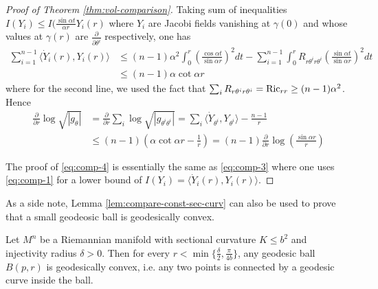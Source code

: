 \documentclass[11pt]{article}
\begin{document}
\begin{proof}[Proof of Theorem \ref{thm:vol-comparison}]
Taking sum of inequalities \(I(Y_{i}) \leq I(\frac{\sin \alpha t}{\alpha
r}Y_i(r)\) where \(Y_i\) are Jacobi fields vanishing at \(\gamma(0)\) and
whose values at \(\gamma(r)\) are \(\frac{\partial}{\partial \theta^i}\) respectively,
one has
\begin{equation*}
\begin{split}
\sum_{i=1}^{n-1} \langle \dot Y_i(r), Y_i(r) \rangle &\leq	(n-1)\alpha^2 \int_0^r\left( \frac{\cos \alpha t}{\sin \alpha r}\right)^2 dt -\sum_{i=1}^{n-1}\int_0^r R_{r\theta^ir\theta^i}\left(\frac{\sin \alpha t}{\sin \alpha r}\right)^2 dt\\
		 	 &\leq (n-1)\alpha\cot \alpha r
\end{split}   
\end{equation*}
where for the second line, we used the fact that \(\sum_i R_{r\theta^i r\theta^i}={\rm
Ric}_{rr}\geq (n-1)\alpha^2\). Hence 
\begin{equation*}
\begin{split}
\frac{\partial}{\partial r}\log\sqrt{|g_\theta|}&= \frac{\partial}{\partial
r}\sum_i\log\sqrt{|g_{\theta^i\theta^i}|} = \sum_i \langle \dot
Y_{\theta^i},Y_{\theta^i}\rangle - \frac{n-1}{r}\\
 				 &\leq (n-1)\left(\alpha\cot \alpha r - \frac{1}{r}\right) = (n-1) \frac{\partial}{\partial r}\log \left( \frac{\sin \alpha r}{r}\right)
\end{split}   
\end{equation*}

The proof of \eqref{eq:comp-4} is essentially the same as \eqref{eq:comp-3} where one uses
\eqref{eq:comp-1} for a lower bound of \(I(Y_i) = \langle \dot Y_i(r), Y_i(r) \rangle\).
\end{proof}


As a side note, Lemma \ref{lem:compare-const-sec-curv} can also be used to prove that a small geodeosic ball
is geodesically convex.

\begin{proposition}
\label{prop:geodesic-convex}
Let \(M^n\) be a Riemannian manifold with sectional curvature \(K\leq b^2\) and
injectivity radius \(\delta >0\). Then for every \(r<\min\{\frac{\delta}{2},
\frac{\pi}{4b}\}\), any geodesic ball \(B(p,r)\) is geodesically convex, i.e. any two
points is connected by a geodesic curve inside the ball.
\end{proposition}
\end{document}
